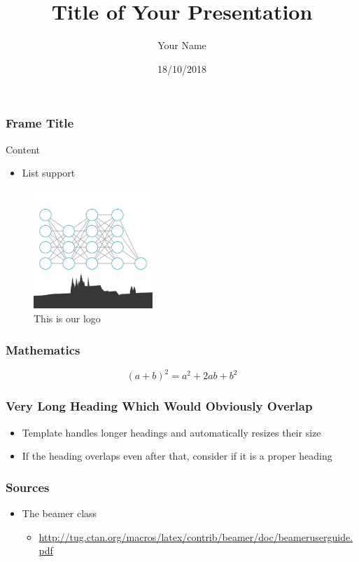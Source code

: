 \documentclass{beamer}
\title[Short Title]{Title of Your Presentation}
\author{Your Name}
\date{18/10/2018}
\begin{document}

\begin{frame}
  \frametitle{Frame Title}

  Content

  \begin{itemize}
    \item List support
  \end{itemize}

  \begin{figure}
      \includegraphics[width=0.4\textwidth]{logo}
      \caption{This is our logo}
      \label{fig:logo}
  \end{figure}

\end{frame}

\begin{frame}
  \frametitle{Mathematics}

  \[
    (a + b)^2 = a^2 + 2ab + b^2
  \]

\end{frame}

%
%
%
%

\begin{frame}
  \frametitle{Very Long Heading Which Would Obviously Overlap}

  \begin{itemize}
    \item Template handles longer headings and automatically resizes their size
    \item If the heading overlaps even after that, consider if it is a proper heading
  \end{itemize}

\end{frame}

\begin{frame}
  \frametitle{Sources}

  \begin{itemize}
    \item The beamer class
    \begin{itemize}
      \item \url{http://tug.ctan.org/macros/latex/contrib/beamer/doc/beameruserguide.pdf}
    \end{itemize}
  \end{itemize}

\end{frame}
\end{document}
